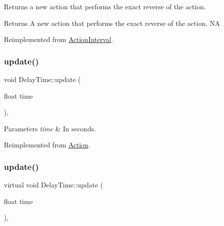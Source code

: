 Returns a new action that performs the exact reverse of the action.

\begin{DoxyReturn}{Returns}
A new action that performs the exact reverse of the action.  NA 
\end{DoxyReturn}


Reimplemented from \hyperlink{classActionInterval_a9f9ac7164036a0bc261a72f62a2b2da7}{Action\+Interval}.

\mbox{\label{classDelayTime_a95c80d348c1803a2cb832a3d0e246c5e}} 
\subsubsection{\texorpdfstring{update()}{update()}\hspace{0.1cm}{\footnotesize\ttfamily [1/2]}}
{\footnotesize\ttfamily void Delay\+Time\+::update (\begin{DoxyParamCaption}\item[{float}]{time }\end{DoxyParamCaption})\hspace{0.3cm}{\ttfamily [override]}, {\ttfamily [virtual]}}


\begin{DoxyParams}{Parameters}
{\em time} & In seconds. \\
\hline
\end{DoxyParams}


Reimplemented from \hyperlink{classAction_a937e646e63915e33ad05ba149bfcf239}{Action}.

\mbox{\label{classDelayTime_abff66697a3fa8d997d5ae190ec7f6a8e}} 
\subsubsection{\texorpdfstring{update()}{update()}\hspace{0.1cm}{\footnotesize\ttfamily [2/2]}}
{\footnotesize\ttfamily virtual void Delay\+Time\+::update (\begin{DoxyParamCaption}\item[{float}]{time }\end{DoxyParamCaption})\hspace{0.3cm}{\ttfamily [override]}, {\ttfamily [virtual]}}


